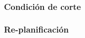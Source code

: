 \subsubsection{Condición de corte}
 \label{subsub:condicion_de_corte}
  
 
 
 
 
 
  
\subsubsection{Re-planificación}
 \label{subsub:replanificacion}
  
 

